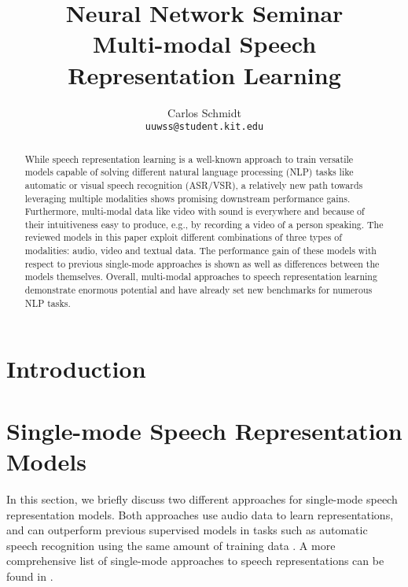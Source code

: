 \documentclass[11pt]{article}
\title{Neural Network Seminar\\Multi-modal Speech Representation Learning}
\author{Carlos Schmidt \\\texttt{uuwss@student.kit.edu}\\}
\begin{document}
\maketitle
\begin{abstract}
While speech representation learning is a well-known approach to train versatile models capable of solving different natural language processing (NLP) tasks like automatic or visual speech recognition (ASR/VSR), a relatively new path towards leveraging multiple modalities shows promising downstream performance gains. Furthermore, multi-modal data like video with sound is everywhere and because of their intuitiveness easy to produce, e.g., by recording a video of a person speaking. The reviewed models in this paper exploit different combinations of three types of modalities: audio, video and textual data. The performance gain of these models with respect to previous single-mode approaches is shown as well as differences between the models themselves. Overall, multi-modal approaches to speech representation learning demonstrate enormous potential and have already set new benchmarks for numerous NLP tasks.
\end{abstract}

\section{Introduction}

\section{Single-mode Speech Representation Models}\label{sec:single-mode}
In this section, we briefly discuss two different approaches for single-mode speech representation models. Both approaches use audio data to learn representations, and can outperform previous supervised models in tasks such as automatic speech recognition using the same amount of training data \cite{wav2vec20}. A more comprehensive list of single-mode approaches to speech representations can be found in \cite{srl-review}.
\end{document}
